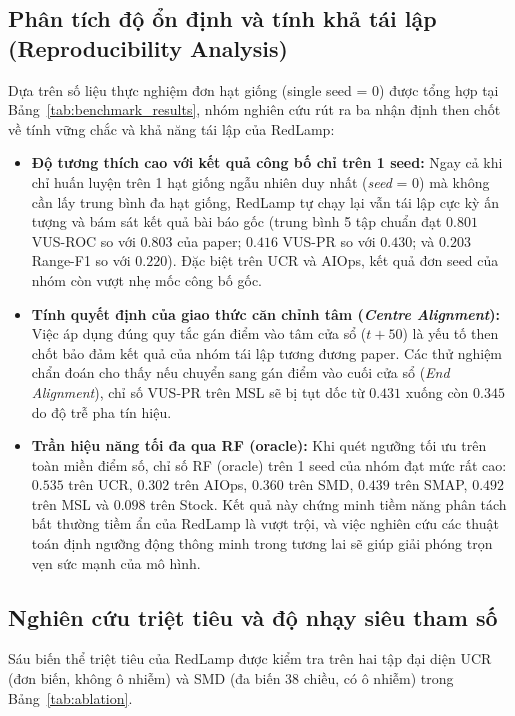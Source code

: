 \documentclass[sigconf,nonacm]{acmart}
\begin{document}
\subsection{Phân tích độ ổn định và tính khả tái lập (Reproducibility Analysis)}

Dựa trên số liệu thực nghiệm đơn hạt giống (single seed = 0) được tổng hợp tại Bảng~\ref{tab:benchmark_results}, nhóm nghiên cứu rút ra ba nhận định then chốt về tính vững chắc và khả năng tái lập của RedLamp:
\begin{itemize}[leftmargin=*, itemsep=2pt, parsep=0pt]
    \item \textbf{Độ tương thích cao với kết quả công bố chỉ trên 1 seed:} Ngay cả khi chỉ huấn luyện trên 1 hạt giống ngẫu nhiên duy nhất (\textit{seed} = 0) mà không cần lấy trung bình đa hạt giống, RedLamp tự chạy lại vẫn tái lập cực kỳ ấn tượng và bám sát kết quả bài báo gốc (trung bình 5 tập chuẩn đạt $0.801$ VUS-ROC so với $0.803$ của paper; $0.416$ VUS-PR so với $0.430$; và $0.203$ Range-F1 so với $0.220$). Đặc biệt trên UCR và AIOps, kết quả đơn seed của nhóm còn vượt nhẹ mốc công bố gốc.
    \item \textbf{Tính quyết định của giao thức căn chỉnh tâm (\textit{Centre Alignment}):} Việc áp dụng đúng quy tắc gán điểm vào tâm cửa sổ ($t + 50$) là yếu tố then chốt bảo đảm kết quả của nhóm tái lập tương đương paper. Các thử nghiệm chẩn đoán cho thấy nếu chuyển sang gán điểm vào cuối cửa sổ (\textit{End Alignment}), chỉ số VUS-PR trên MSL sẽ bị tụt dốc từ $0.431$ xuống còn $0.345$ do độ trễ pha tín hiệu.
    \item \textbf{Trần hiệu năng tối đa qua RF (oracle):} Khi quét ngưỡng tối ưu trên toàn miền điểm số, chỉ số RF (oracle) trên 1 seed của nhóm đạt mức rất cao: $0.535$ trên UCR, $0.302$ trên AIOps, $0.360$ trên SMD, $0.439$ trên SMAP, $0.492$ trên MSL và $0.098$ trên Stock. Kết quả này chứng minh tiềm năng phân tách bất thường tiềm ẩn của RedLamp là vượt trội, và việc nghiên cứu các thuật toán định ngưỡng động thông minh trong tương lai sẽ giúp giải phóng trọn vẹn sức mạnh của mô hình.
\end{itemize}

\subsection{Nghiên cứu triệt tiêu và độ nhạy siêu tham số}

Sáu biến thể triệt tiêu của RedLamp được kiểm tra trên hai tập đại diện UCR (đơn biến, không ô nhiễm) và SMD (đa biến 38 chiều, có ô nhiễm) trong Bảng~\ref{tab:ablation}.
\end{document}
